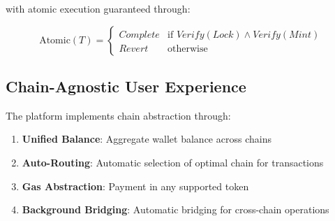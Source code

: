 with atomic execution guaranteed through:

\begin{equation}
\text{Atomic}(T) = \begin{cases}
Complete & \text{if } Verify(Lock) \land Verify(Mint) \\
Revert & \text{otherwise}
\end{cases}
\end{equation}

\subsection{Chain-Agnostic User Experience}

The platform implements chain abstraction through:

\begin{enumerate}
\item \textbf{Unified Balance}: Aggregate wallet balance across chains
\item \textbf{Auto-Routing}: Automatic selection of optimal chain for transactions
\item \textbf{Gas Abstraction}: Payment in any supported token
\item \textbf{Background Bridging}: Automatic bridging for cross-chain operations
\end{enumerate}


